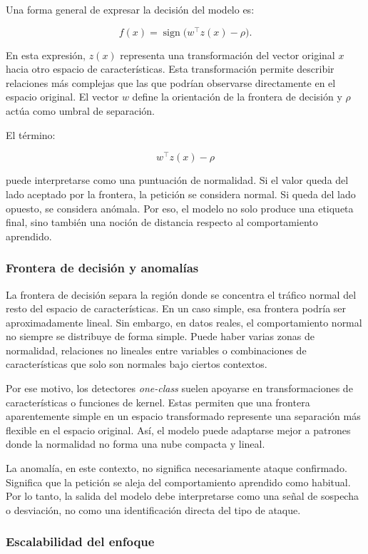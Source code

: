\documentclass[12pt,oneside]{report}
\begin{document}
Una forma general de expresar la decisión del modelo es:

\[
f(x)=\operatorname{sign}\big(w^\top z(x)-\rho\big).
\]

En esta expresión, $z(x)$ representa una transformación del vector original $x$ hacia otro espacio de características. Esta transformación permite describir relaciones más complejas que las que podrían observarse directamente en el espacio original. El vector $w$ define la orientación de la frontera de decisión y $\rho$ actúa como umbral de separación.

El término:

\[
w^\top z(x)-\rho
\]

puede interpretarse como una puntuación de normalidad. Si el valor queda del lado aceptado por la frontera, la petición se considera normal. Si queda del lado opuesto, se considera anómala. Por eso, el modelo no solo produce una etiqueta final, sino también una noción de distancia respecto al comportamiento aprendido.

\subsubsection{Frontera de decisión y anomalías}

La frontera de decisión separa la región donde se concentra el tráfico normal del resto del espacio de características. En un caso simple, esa frontera podría ser aproximadamente lineal. Sin embargo, en datos reales, el comportamiento normal no siempre se distribuye de forma simple. Puede haber varias zonas de normalidad, relaciones no lineales entre variables o combinaciones de características que solo son normales bajo ciertos contextos.

Por ese motivo, los detectores \textit{one-class} suelen apoyarse en transformaciones de características o funciones de kernel. Estas permiten que una frontera aparentemente simple en un espacio transformado represente una separación más flexible en el espacio original. Así, el modelo puede adaptarse mejor a patrones donde la normalidad no forma una nube compacta y lineal.

La anomalía, en este contexto, no significa necesariamente ataque confirmado. Significa que la petición se aleja del comportamiento aprendido como habitual. Por lo tanto, la salida del modelo debe interpretarse como una señal de sospecha o desviación, no como una identificación directa del tipo de ataque.

\subsubsection{Escalabilidad del enfoque}
\end{document}
